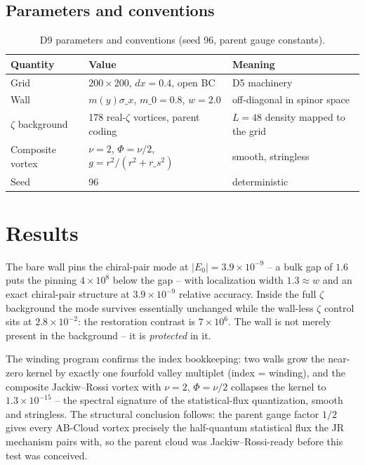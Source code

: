 \documentclass[11pt,a4paper]{article}
\begin{document}
\subsection{Parameters and conventions}
\begin{table}[htbp]\centering\small
\begin{tabularx}{\columnwidth}{@{}l l X@{}}
\toprule
Quantity & Value & Meaning \\
\midrule
Grid & $200 \times 200$, $dx = 0.4$, open BC & D5 machinery \\
Wall & $m(y)\sigma\_x$, $m\_0 = 0.8$, $w = 2.0$ & off-diagonal in spinor space \\
$\zeta$ background & 178 real-$\zeta$ vortices, parent coding & $L=48$ density mapped to the grid \\
Composite vortex & $\nu = 2$, $\Phi = \nu/2$, $g = r^2/(r^2+r\_s^2)$ & smooth, stringless \\
Seed & 96 & deterministic \\
\bottomrule
\end{tabularx}
\caption{D9 parameters and conventions (seed 96, parent gauge constants).}
\end{table}

\section{Results}
The bare wall pins the chiral-pair mode at $|E_0| = 3.9\times10^{-9}$ -- a bulk gap of $1.6$ puts the pinning $4\times10^{8}$ below the gap -- with localization width $1.3 \approx w$ and an exact chiral-pair structure at $3.9\times10^{-9}$ relative accuracy. Inside the full $\zeta$ background the mode survives essentially unchanged while the wall-less $\zeta$ control sits at $2.8\times10^{-2}$: the restoration contrast is $7\times10^{6}$. The wall is not merely present in the background -- it is \emph{protected} in it.

The winding program confirms the index bookkeeping: two walls grow the near-zero kernel by exactly one fourfold valley multiplet (index = winding), and the composite Jackiw--Rossi vortex with $\nu = 2$, $\Phi = \nu/2$ collapses the kernel to $1.3\times10^{-15}$ -- the spectral signature of the statistical-flux quantization, smooth and stringless. The structural conclusion follows: the parent gauge factor $1/2$ gives every AB-Cloud vortex precisely the half-quantum statistical flux the JR mechanism pairs with, so the parent cloud was Jackiw--Rossi-ready before this test was conceived.
\end{document}
